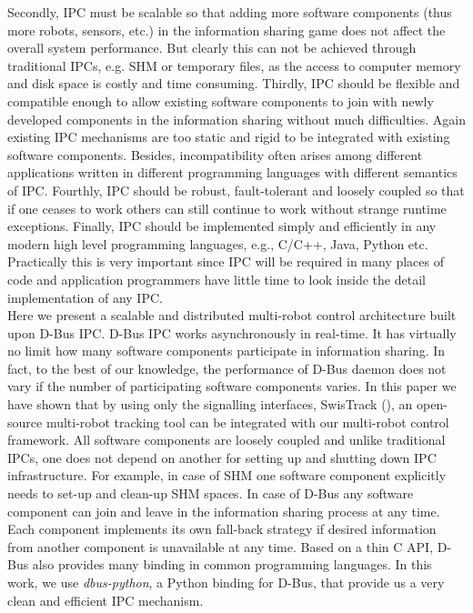 Secondly, IPC must be scalable so that adding more software components (thus more robots, sensors, etc.) in the information sharing game does not affect the overall system performance. But clearly this can not be achieved through traditional IPCs, e.g. SHM or temporary files,  as the access to computer memory and disk space is costly and time consuming. Thirdly, IPC should be flexible and compatible enough to allow existing software components to join with newly developed components in the information sharing without much difficulties. Again existing IPC mechanisms are too static and rigid to be integrated with existing software components. Besides, incompatibility often arises among different applications written in different programming languages with different semantics of IPC. Fourthly, IPC should be robust, fault-tolerant and loosely coupled so that if one ceases to work others can still continue to work without strange runtime exceptions. Finally, IPC should be implemented simply and efficiently in any modern high level programming languages, e.g., C/C++, Java, Python etc. Practically this is very important since IPC will be required in many places of code and application programmers have little time to look inside the detail implementation of any IPC.\\
Here we present a scalable and distributed multi-robot control architecture built upon D-Bus IPC. D-Bus IPC works asynchronously in real-time. It has virtually no limit how many software components participate in information sharing. In fact, to the best of our knowledge, the performance of D-Bus daemon does not vary if the number of participating software components varies. In this paper we have shown that by using only the signalling interfaces, SwisTrack (\cite{Lochmatter+2008}), an open-source multi-robot tracking tool can be integrated with our multi-robot control framework. All software components are loosely coupled and unlike traditional IPCs, one does not depend on another for setting up and shutting down IPC infrastructure. For example, in case of SHM one software component explicitly needs to set-up and clean-up SHM spaces. In case of D-Bus any software component can join and leave in the information sharing process at any time. Each component implements its own fall-back strategy if desired information from another component is unavailable at any time. Based on a thin C API, D-Bus also provides many binding in common programming languages. In this work, we use {\em dbus-python}, a Python binding for D-Bus, that provide us a very clean and efficient IPC mechanism.\\
